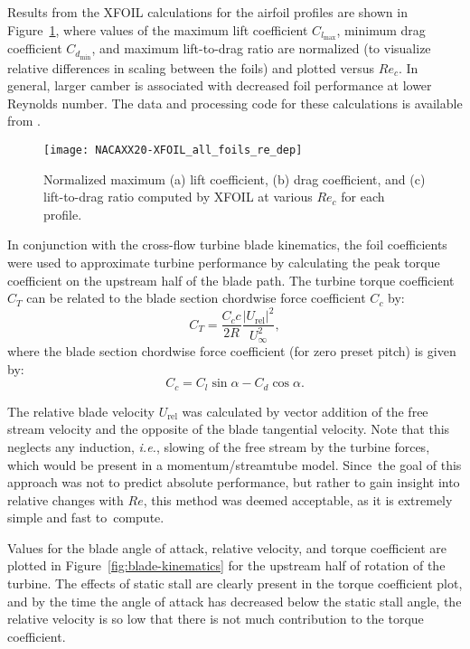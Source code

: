Results from the XFOIL calculations for the airfoil profiles are shown in
Figure~\ref{fig:foil-Re-dep}, where values of the maximum lift coefficient
$C_{l_{\max}}$, minimum drag coefficient $C_{d_{\min}}$, and maximum
lift-to-drag ratio are normalized (to visualize relative differences in scaling
between the foils) and plotted versus $Re_c$. In general, larger camber
is associated with decreased foil performance at lower Reynolds number. The data
and processing code for these calculations is available from
\cite{Bachant2016-NACAXX20-XFOIL}.

\begin{figure}
    \centering
    
    \texttt{[image: NACAXX20-XFOIL\_all\_foils\_re\_dep]}
    
    \caption{Normalized maximum (a) lift coefficient, (b) drag coefficient, and
        (c) lift-to-drag ratio computed by XFOIL at various $Re_c$  for each
        profile.}
    
    \label{fig:foil-Re-dep}
\end{figure}

In conjunction with the cross-flow turbine blade kinematics, the foil
coefficients were used to approximate turbine performance by calculating the
peak torque coefficient on the upstream half of the blade path. The turbine
torque coefficient $C_T$ can be related to the blade section chordwise force
coefficient $C_c$ by:
\begin{equation}
    C_T = \frac{C_c c}{2R} \frac{|U_\mathrm{rel}|^2}{U_\infty^2},
    \label{eq:ct}
\end{equation}
where the blade section chordwise force coefficient (for zero preset pitch) is
given by:
\begin{equation}
    C_c = C_l \sin \alpha - C_d \cos \alpha.
    \label{eq:cc}
\end{equation}

The relative blade velocity $U_\mathrm{rel}$ was calculated by vector addition
of the free stream velocity and the opposite of the blade tangential velocity.
Note that this neglects any induction, \emph{i.e.}, slowing of the free stream
by the turbine forces, which would be present in a momentum/streamtube model.
Since~the goal of this approach was not to predict absolute performance, but
rather to gain insight into relative changes with $Re$, this method was deemed
acceptable, as it is extremely simple and fast to~compute.

Values for the blade angle of attack, relative velocity, and torque coefficient
are plotted in Figure~\ref{fig:blade-kinematics} for the upstream half of
rotation of the turbine. The effects of static stall are clearly present in the
torque coefficient plot, and by the time the angle of attack has decreased below
the static stall angle, the relative velocity is so low that there is not much
contribution to the torque coefficient.

